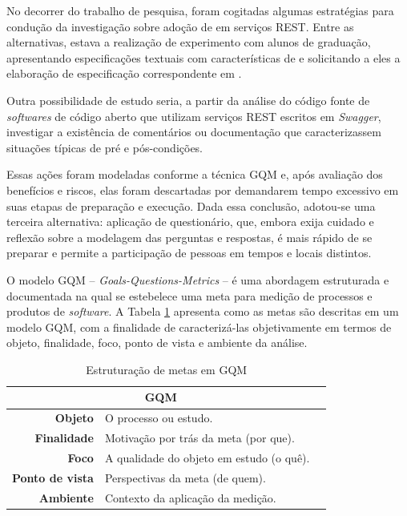 No decorrer do trabalho de pesquisa, foram cogitadas algumas estratégias para
condução da investigação sobre adoção de \designbycontract{} em serviços REST.
Entre as alternativas, estava a realização de experimento com alunos de
graduação, apresentando especificações textuais com características de
\designbycontract{} e solicitando a eles a elaboração de especificação
correspondente em \neoidl{}.

Outra possibilidade de estudo seria, a partir da análise do
código fonte de \textit{softwares} de código aberto que utilizam serviços REST escritos
em \textit{Swagger}, investigar a existência de comentários ou documentação que
caracterizassem situações típicas de pré e pós-condições. 

Essas ações foram modeladas conforme a técnica GQM\cite{basili1992software} e,
após avaliação dos benefícios e riscos, elas foram descartadas por
demandarem tempo excessivo em suas etapas de preparação e execução. Dada essa
conclusão, adotou-se uma terceira alternativa: aplicação de questionário, que, embora exija cuidado e reflexão sobre a modelagem das perguntas e respostas, é mais rápido de se preparar e permite a participação de pessoas em tempos e locais distintos.

O modelo GQM -- \textit{Goals-Questions-Metrics} -- é uma abordagem
estruturada e documentada na qual se estebelece uma meta para medição de
processos e produtos de \textit{software}. A Tabela \ref{TabelaMetasGQM}
apresenta como as metas são descritas em um modelo GQM, com a finalidade de
caracterizá-las objetivamente em termos de objeto, finalidade, foco, ponto de
vista e ambiente da análise.

\begin{table}[h]
\centering
\vspace{0.5cm}
\begin{tabular}{r|lr}
\multicolumn{2}{c}{GQM}\\
\hline    
\textbf{Objeto} & O processo ou estudo. \\
\textbf{Finalidade}  & Motivação por trás da meta (por que). \\
\textbf{Foco} & A qualidade do objeto em estudo (o quê).\\
\textbf{Ponto de vista} & Perspectivas da meta (de quem). \\
\textbf{Ambiente} & Contexto da aplicação da medição.           
\end{tabular}
\caption{Estruturação de metas em GQM}
\label{TabelaMetasGQM}
\end{table}

